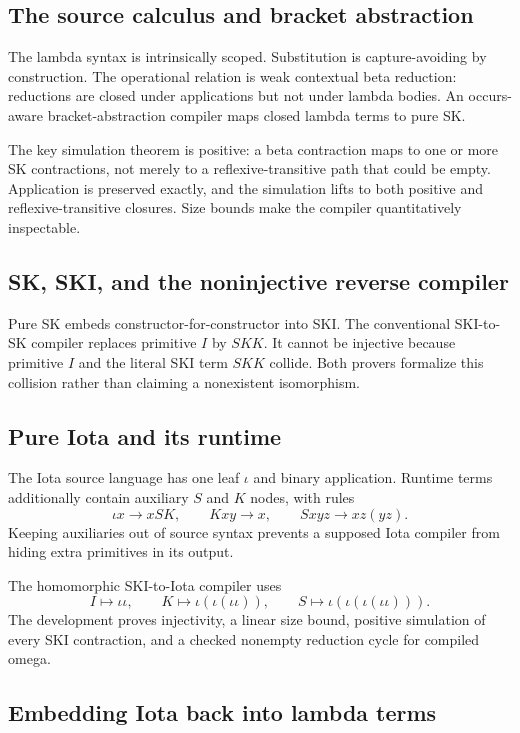 \documentclass[
  10pt,
  a4paper,
  twoside,
  open=any,
  parskip=half,
  headings=big
]{scrreprt}
\begin{document}
\subsection{The source calculus and bracket abstraction}

The lambda syntax is intrinsically scoped. Substitution is capture-avoiding by construction. The operational relation is weak contextual beta reduction: reductions are closed under applications but not under lambda bodies. An occurs-aware bracket-abstraction compiler maps closed lambda terms to pure SK.

The key simulation theorem is positive: a beta contraction maps to one or more SK contractions, not merely to a reflexive-transitive path that could be empty. Application is preserved exactly, and the simulation lifts to both positive and reflexive-transitive closures. Size bounds make the compiler quantitatively inspectable.

\subsection{SK, SKI, and the noninjective reverse compiler}

Pure SK embeds constructor-for-constructor into SKI. The conventional SKI-to-SK compiler replaces primitive $I$ by $SKK$. It cannot be injective because primitive $I$ and the literal SKI term $SKK$ collide. Both provers formalize this collision rather than claiming a nonexistent isomorphism.

\subsection{Pure Iota and its runtime}

The Iota source language has one leaf $\iota$ and binary application. Runtime terms additionally contain auxiliary $S$ and $K$ nodes, with rules
\[
\iota x\to xSK,\qquad Kxy\to x,\qquad Sxyz\to xz(yz).
\]
Keeping auxiliaries out of source syntax prevents a supposed Iota compiler from hiding extra primitives in its output.

The homomorphic SKI-to-Iota compiler uses
\[
 I\mapsto\iota\iota,
 \qquad K\mapsto\iota(\iota(\iota\iota)),
 \qquad S\mapsto\iota(\iota(\iota(\iota\iota))).
\]
The development proves injectivity, a linear size bound, positive simulation of every SKI contraction, and a checked nonempty reduction cycle for compiled omega.

\subsection{Embedding Iota back into lambda terms}
\end{document}
